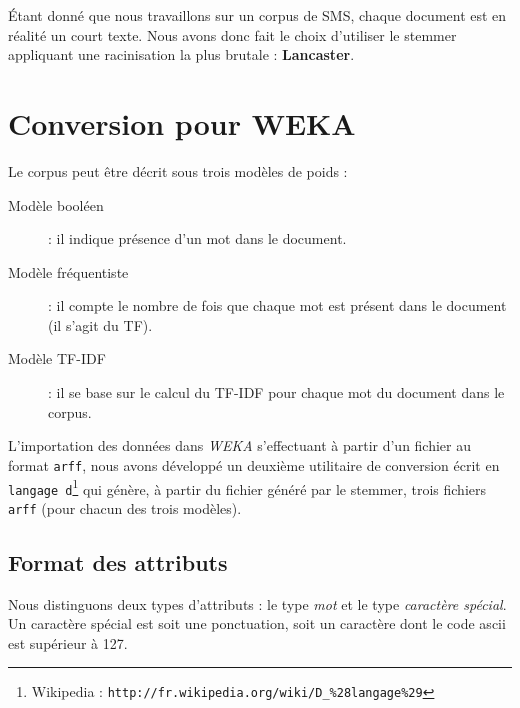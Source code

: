 Étant donné que nous travaillons sur un corpus de SMS, chaque document est en réalité un court texte. Nous avons donc fait le choix d'utiliser le stemmer appliquant une racinisation la plus brutale : \textbf{Lancaster}.

\section{Conversion pour WEKA}
Le corpus peut être décrit sous trois modèles de poids :

\begin{description}
\item[Modèle booléen] : il indique présence d'un mot dans le document.
\item[Modèle fréquentiste] : il compte le nombre de fois que chaque mot est présent dans le document (il s'agit du TF).
\item[Modèle TF-IDF] : il se base sur le calcul du TF-IDF pour chaque mot du document dans le corpus.
\end{description}

L'importation des données dans \textit{WEKA} s'effectuant à partir d'un fichier au format \texttt{arff}, nous avons développé un deuxième utilitaire de conversion écrit en \texttt{langage d}\footnote{Wikipedia : \texttt{http://fr.wikipedia.org/wiki/D\_\%28langage\%29}} qui génère, à partir du fichier généré par le stemmer, trois fichiers \texttt{arff} (pour chacun des trois modèles).

\subsection*{Format des attributs}

Nous distinguons deux types d'attributs : le type \textit{mot} et le type \textit{caractère spécial}. Un caractère spécial est soit une ponctuation, soit un caractère dont le code ascii est supérieur à 127.


